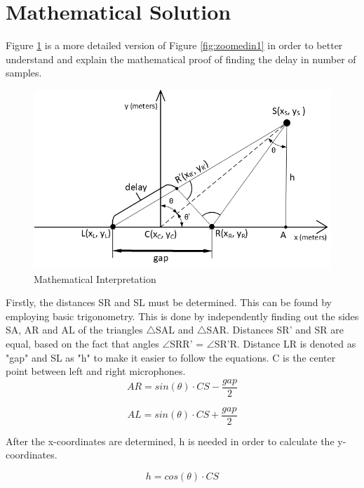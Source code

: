 \newpage
\section{Mathematical Solution}

Figure \ref{fig:zoomedin2} is a more detailed version of Figure \ref{fig:zoomedin1} 
in order to better understand and explain the mathematical proof of finding the 
delay in number of samples.

\begin{figure}[htp]
	\centering
	\includegraphics[width=1\textwidth]{Illustrations/mathematicalShit.jpg}
	\caption{Mathematical Interpretation}
	\label{fig:zoomedin2}
\end{figure}

Firstly, the distances SR and SL must be determined. This can be found by employing 
basic trigonometry. This is done by independently finding out the sides SA, AR and 
AL of the triangles $\triangle$SAL  and $\triangle$SAR. Distances SR' and SR are 
equal, based on the fact that angles $\angle$SRR' = $\angle$SR'R. Distance LR is 
denoted as "gap" and SL as "h" to make it easier to follow the equations. C is the 
center point between left and right microphones.
\begin{equation}
	AR = sin(\theta) \cdot CS  - \dfrac{gap}{2} 
\end{equation}

\begin{equation}
	AL = sin(\theta) \cdot CS + \dfrac{gap}{2}
\end{equation}

After the x-coordinates are determined, h is needed in order to calculate the y-
coordinates.

\begin{equation}
	h = cos(\theta) \cdot CS
\end{equation}

